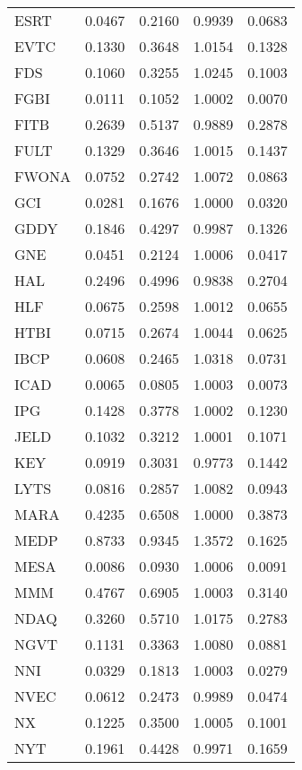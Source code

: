 \begin{table}
\begin{tabular}{lrrrr}
ESRT & 0.0467 & 0.2160 & 0.9939 & 0.0683 \\
EVTC & 0.1330 & 0.3648 & 1.0154 & 0.1328 \\
FDS & 0.1060 & 0.3255 & 1.0245 & 0.1003 \\
FGBI & 0.0111 & 0.1052 & 1.0002 & 0.0070 \\
FITB & 0.2639 & 0.5137 & 0.9889 & 0.2878 \\
FULT & 0.1329 & 0.3646 & 1.0015 & 0.1437 \\
FWONA & 0.0752 & 0.2742 & 1.0072 & 0.0863 \\
GCI & 0.0281 & 0.1676 & 1.0000 & 0.0320 \\
GDDY & 0.1846 & 0.4297 & 0.9987 & 0.1326 \\
GNE & 0.0451 & 0.2124 & 1.0006 & 0.0417 \\
HAL & 0.2496 & 0.4996 & 0.9838 & 0.2704 \\
HLF & 0.0675 & 0.2598 & 1.0012 & 0.0655 \\
HTBI & 0.0715 & 0.2674 & 1.0044 & 0.0625 \\
IBCP & 0.0608 & 0.2465 & 1.0318 & 0.0731 \\
ICAD & 0.0065 & 0.0805 & 1.0003 & 0.0073 \\
IPG & 0.1428 & 0.3778 & 1.0002 & 0.1230 \\
JELD & 0.1032 & 0.3212 & 1.0001 & 0.1071 \\
KEY & 0.0919 & 0.3031 & 0.9773 & 0.1442 \\
LYTS & 0.0816 & 0.2857 & 1.0082 & 0.0943 \\
MARA & 0.4235 & 0.6508 & 1.0000 & 0.3873 \\
MEDP & 0.8733 & 0.9345 & 1.3572 & 0.1625 \\
MESA & 0.0086 & 0.0930 & 1.0006 & 0.0091 \\
MMM & 0.4767 & 0.6905 & 1.0003 & 0.3140 \\
NDAQ & 0.3260 & 0.5710 & 1.0175 & 0.2783 \\
NGVT & 0.1131 & 0.3363 & 1.0080 & 0.0881 \\
NNI & 0.0329 & 0.1813 & 1.0003 & 0.0279 \\
NVEC & 0.0612 & 0.2473 & 0.9989 & 0.0474 \\
NX & 0.1225 & 0.3500 & 1.0005 & 0.1001 \\
NYT & 0.1961 & 0.4428 & 0.9971 & 0.1659 \\
\bottomrule
\end{tabular}
\end{table}
